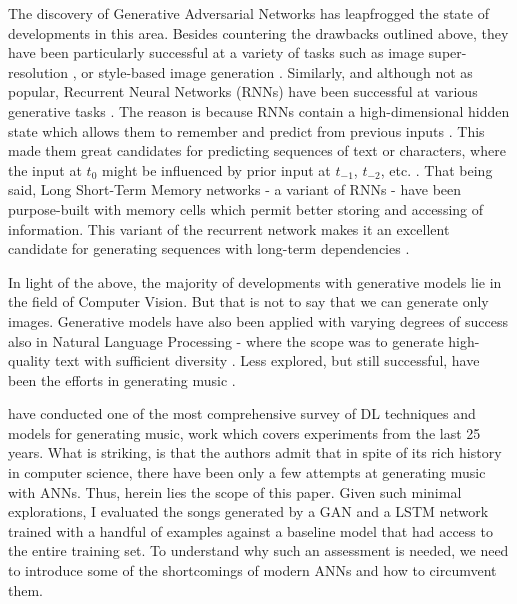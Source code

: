 \documentclass[a4paper]{book}
\begin{document}
The discovery of Generative Adversarial Networks \parencite[GANs;][]{goodfellow_generative_2014} has leapfrogged the state of developments in this area. Besides countering the drawbacks outlined above, they have been particularly successful at a variety of tasks such as image super-resolution \parencite{ledig_photo-realistic_2016}, or style-based image generation \parencite{karras_style-based_2018}. Similarly, and although not as popular, Recurrent Neural Networks (RNNs) have been successful at various generative tasks \parencite{jenal_rnn-based_2019, ICML2011Sutskever_524}. The reason is because RNNs contain a high-dimensional hidden state which allows them to remember and predict from previous inputs \parencite{ICML2011Sutskever_524}. This made them great candidates for predicting sequences \parencite{graves_generating_2013} of text or characters, where the input at $t_0$ might be influenced by prior input at $t_{-1}$, $t_{-2}$, etc. \parencite{fan_tts_2014}. That being said, Long Short-Term Memory networks \parencite[LSTM;][]{hochreiter_long_1997} - a variant of RNNs - have been purpose-built with memory cells which permit better storing and accessing of information. This variant of the recurrent network makes it an excellent candidate for generating sequences with long-term dependencies \parencite{graves_generating_2013}.

In light of the above, the majority of developments with generative models lie in the field of Computer Vision. But that is not to say that we can generate only images. Generative models have also been applied with varying degrees of success also in Natural Language Processing - where the scope was to generate high-quality text with sufficient diversity \parencite[e.g.,][]{yu_seqgan_2016, chen_adversarial_2018}. Less explored, but still successful, have been the efforts in generating music \parencite[e.g.,][]{mogren_c-rnn-gan_2016, dong_musegan_2017}. 

\textcite{briot_deep_2017} have conducted one of the most comprehensive survey of DL techniques and models for generating music, work which covers experiments from the last 25 years. What is striking, is that the authors admit that in spite of its rich history in computer science, there have been only a few attempts at generating music with ANNs. Thus, herein lies the scope of this paper. Given such minimal explorations, I evaluated the songs generated by a GAN \parencite{mogren_c-rnn-gan_2016} and a LSTM network \parencite{oore_this_2018} trained with a handful of examples against a baseline model that had access to the entire training set. To understand why such an assessment is needed, we need to introduce some of the shortcomings of modern ANNs and how to circumvent them.
\end{document}
